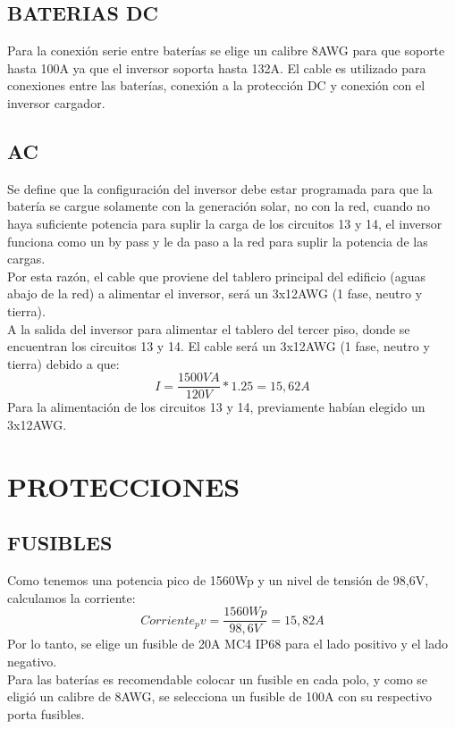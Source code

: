 \documentclass[journal]{IEEEtran}
\begin{document}
\subsection*{BATERIAS DC}
Para la conexión serie entre baterías se elige un calibre 8AWG para que soporte hasta 100A ya que el inversor soporta hasta 132A. El cable es utilizado para conexiones entre las baterías, conexión a la protección DC y conexión con el inversor cargador. 

\subsection*{AC}

Se define que la configuración del inversor debe estar programada para que la batería se cargue solamente con la generación solar, no con la red, cuando no haya suficiente potencia para suplir la carga de los circuitos 13 y 14, el inversor funciona como un by pass y le da paso a la red para suplir la potencia de las cargas.\\
Por esta razón, el cable que proviene del tablero principal del edificio (aguas abajo de la red) a alimentar el inversor, será un 3x12AWG (1 fase, neutro y tierra). \\

A la salida del inversor para alimentar el tablero del tercer piso, donde se encuentran los circuitos 13 y 14. El cable será un 3x12AWG (1 fase, neutro y tierra) debido a que:\\
$$I=\dfrac{1500VA}{120V}*1.25=15,62A$$
Para la alimentación de los circuitos 13 y 14, previamente habían elegido un 3x12AWG. 
\section*{PROTECCIONES}

\subsection*{FUSIBLES}

Como tenemos una potencia pico de 1560Wp y un nivel de tensión de 98,6V, calculamos la corriente:\\
$$Corriente_pv=\dfrac{1560Wp}{98,6V}=15,82A$$
Por lo tanto, se elige un fusible de 20A MC4 IP68 para el lado positivo y el lado negativo. \\

Para las baterías es recomendable colocar un fusible en cada polo, y como se eligió un calibre de 8AWG, se selecciona un fusible de 100A con su respectivo porta fusibles.
\end{document}
